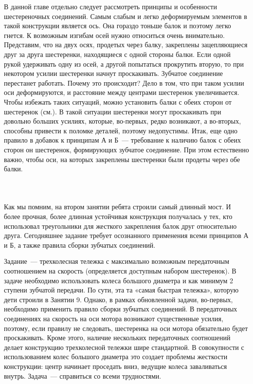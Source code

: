 В данной главе отдельно следует рассмотреть принципы и особенности шестереночных соединений. Самым слабым и легко деформируемым элементов в такой конструкции является ось. Она гораздо тоньше балок и поэтому легко гнется. К возможным изгибам осей нужно относиться очень внимательно. Представим, что на двух осях, продетых через балку, закреплены зацепляющиеся друг за друга  шестеренки, находящиеся с одной стороны балки. Если одной рукой удерживать одну из осей, а другой попытаться прокрутить вторую, то при некотором усилии шестеренки начнут проскакивать. Зубчатое соединение перестанет работать. Почему это происходит? Дело в том, что при таком усилии оси деформируются, и расстояние между центрами шестеренок увеличивается. Чтобы избежать таких ситуаций, можно установить балки с обеих сторон от шестеренок (см.). В такой ситуации шестеренки могут проскакивать при довольно больших усилиях, которые, во-первых, редко возникают, а во-вторых, способны привести к поломке деталей, поэтому недопустимы. Итак, еще одно правило в добавок к принципам А и Б~--- требование к наличию балок с обеих сторон он шестеренок, формирующих зубчатое соединение. При этом естественно важно, чтобы оси, на которых закреплены шестеренки были продеты через обе балки.\\\\

{\hypertarget{lesson19x6}{}}\\\\

Как мы помним, на втором занятии ребята строили самый длинный мост. И более прочная, более длинная устойчивая конструкция получалась у тех, кто использовал треугольники для жесткого закрепления балок друг относительно друга. Сегодняшнее задание требует осознанного применения всеми принципов А и Б, а также правила сборки зубчатых соединений. 

Задание~--- трехколесная тележка с максимально возможным передаточным соотношением на скорость (определяется доступным набором шестеренок). В задаче необходимо использовать колеса большого диаметра и как минимум 2 ступени зубчатой передачи. По сути, эта та «самая быстрая тележка», которую дети строили в Занятии 9. Однако, в рамках обновленной задачи, во-первых, необходимо применить правило сборки зубчатых соединений. В передаточных соединениях на скорость на оси мотора возникают существенные усилия, поэтому, если правилу не следовать, шестеренка на оси мотора обязательно будет проскакивать. Кроме этого, наличие нескольких передаточных соотношений делает конструкцию трехколесной тележки шире стандартной. В совокупности с использованием колес большого диаметра это создает проблемы жесткости конструкции: центр начинает проседать вниз, ведущие колеса заваливаться внутрь. Задача~--- справиться со всеми трудностями.

